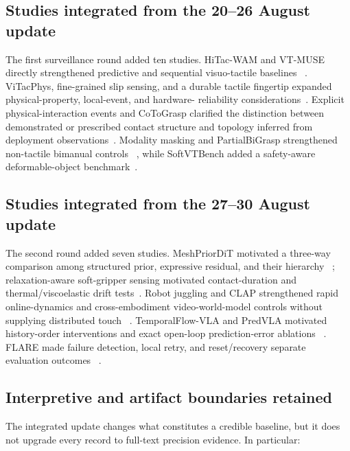 \subsection{Studies integrated from the 20--26 August update}

The first surveillance round added ten studies. HiTac-WAM and VT-MUSE directly
strengthened predictive and sequential visuo-tactile baselines
~\cite{xue2026hitacwam,xu2026vtmuse}. ViTacPhys, fine-grained slip sensing, and a
durable tactile fingertip expanded physical-property, local-event, and hardware-
reliability considerations~\cite{liu2026vitacphys,ma2026slip,cottrell2026durable}.
Explicit physical-interaction events and CoToGrasp clarified the distinction
between demonstrated or prescribed contact structure and topology inferred from
deployment observations~\cite{overbeek2026oneshot,merand2026cotograsp}. Modality
masking and PartialBiGrasp strengthened non-tactile bimanual controls
~\cite{cheng2026modalitymasking,kaura2026partialbigrasp}, while SoftVTBench added
a safety-aware deformable-object benchmark~\cite{jing2026softvtbench}.

\subsection{Studies integrated from the 27--30 August update}

The second round added seven studies. MeshPriorDiT motivated a three-way
comparison among structured prior, expressive residual, and their hierarchy
~\cite{wang2026meshpriordit}; relaxation-aware soft-gripper sensing motivated
contact-duration and thermal/viscoelastic drift tests~\cite{wang2026relaxation}.
Robot juggling and CLAP strengthened rapid online-dynamics and cross-embodiment
video-world-model controls without supplying distributed touch
~\cite{lee2026robotjuggling,liu2026clap}. TemporalFlow-VLA and PredVLA motivated
history-order interventions and exact open-loop prediction-error ablations
~\cite{yang2026temporalflowvla,sawada2026predvla}. FLARE made failure detection,
local retry, and reset/recovery separate evaluation outcomes
~\cite{zhao2026flare}.

\subsection{Interpretive and artifact boundaries retained}

The integrated update changes what constitutes a credible baseline, but it does
not upgrade every record to full-text precision evidence. In particular:

